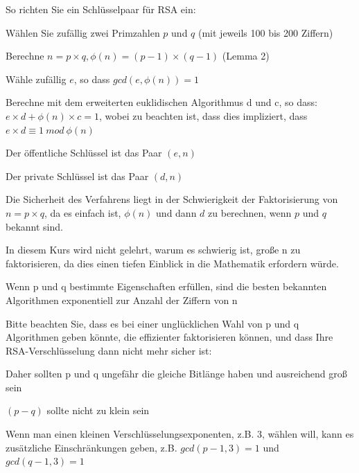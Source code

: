 \documentclass[a4paper]{article}
\begin{document}
\begin{multicols}{3}
\begin{itemize*}
\begin{itemize*}
            \end{itemize*}
            \item So richten Sie ein Schlüsselpaar für RSA ein:
            \begin{itemize*}
                  \item Wählen Sie zufällig zwei Primzahlen $p$ und $q$ (mit jeweils 100 bis 200 Ziffern)
                  \item Berechne $n=p\times q,\phi(n)=(p-1)\times (q-1)$ (Lemma 2)
                  \item Wähle zufällig $e$, so dass $gcd(e,\phi(n))=1$
                  \item Berechne mit dem erweiterten euklidischen Algorithmus d und c, so dass: $e\times d+\phi(n)\times c = 1$, wobei zu beachten ist, dass dies impliziert, dass $e\times d\equiv 1\ mod\ \phi(n)$
                  \item Der öffentliche Schlüssel ist das Paar $(e, n)$
                  \item Der private Schlüssel ist das Paar $(d, n)$
            \end{itemize*}
            \item Die Sicherheit des Verfahrens liegt in der Schwierigkeit der Faktorisierung von $n=p\times q$, da es einfach ist, $\phi(n)$ und dann $d$ zu berechnen, wenn $p$ und $q$ bekannt sind.
            \item In diesem Kurs wird nicht gelehrt, warum es schwierig ist, große n zu faktorisieren, da dies einen tiefen Einblick in die Mathematik erfordern würde.
            \begin{itemize*}
                  \item Wenn p und q bestimmte Eigenschaften erfüllen, sind die besten bekannten Algorithmen exponentiell zur Anzahl der Ziffern von n
                  \item Bitte beachten Sie, dass es bei einer unglücklichen Wahl von p und q Algorithmen geben könnte, die effizienter faktorisieren können, und dass Ihre RSA-Verschlüsselung dann nicht mehr sicher ist:
                  \begin{itemize*}
                        \item Daher sollten p und q ungefähr die gleiche Bitlänge haben und ausreichend groß sein
                        \item $(p-q)$ sollte nicht zu klein sein
                        \item Wenn man einen kleinen Verschlüsselungsexponenten, z.B. 3, wählen will, kann es zusätzliche Einschränkungen geben, z.B. $gcd(p-1, 3) = 1$ und $gcd(q-1,3)=1$

\end{itemize*}
\end{itemize*}
\end{itemize*}
\end{multicols}
\end{document}
